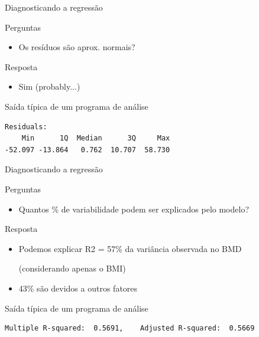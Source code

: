 \documentclass{beamer}
\begin{document}
\begin{frame}[fragile]{Diagnosticando a regressão}
  \begin{block}{Perguntas}
    \begin{itemize}
      \footnotesize
    \item Os resíduos são aprox. normais?
    \end{itemize}
  \end{block}
  \bigskip
  \begin{exampleblock}{Resposta}
    \begin{itemize}
    \item Sim \hfill \footnotesize (probably...)
    \end{itemize}
  \end{exampleblock}
  \vfill
  \begin{exampleblock}{Saída típica de um programa de análise}
    \scriptsize
\begin{verbatim}
Residuals:
    Min      1Q  Median      3Q     Max 
-52.097 -13.864   0.762  10.707  58.730 
\end{verbatim}
\end{exampleblock}
\end{frame}

\begin{frame}[fragile]{Diagnosticando a regressão}
  \begin{block}{Perguntas}
    \begin{itemize}
      \footnotesize
    \item Quantos \% de variabilidade podem ser explicados pelo modelo?
    \end{itemize}
  \end{block}
  \bigskip
  \begin{exampleblock}{Resposta}
    \begin{itemize}
      \footnotesize 
    \item Podemos explicar R2 = 57\% da variância observada no BMD

      \scriptsize(considerando \alert{apenas} o BMI)
      \bigskip
    \item \scriptsize 43\% são devidos a outros fatores
    \end{itemize}
  \end{exampleblock}
  \vfill
  \begin{exampleblock}{Saída típica de um programa de análise}
    \scriptsize
\begin{verbatim}
Multiple R-squared:  0.5691,	Adjusted R-squared:  0.5669 
\end{verbatim}
\end{exampleblock}
\end{frame}
\end{document}
